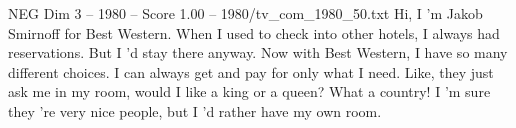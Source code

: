 \begin{textsample}{NEG Dim 3 – 1980 – Score 1.00 – 1980/tv\_com\_1980\_50.txt}  \label{ex:f3_neg_047}
Hi, I 'm Jakob Smirnoff for Best Western.
When I used to check into other hotels, I always had reservations.
But I 'd stay there anyway.
Now with Best Western, I have so many different choices.
I can always get and pay for only what I need.
Like, they just ask me in my room, would I like a king or a queen?
What a country!
I 'm sure they 're very nice people, but I 'd rather have my own room.

\end{textsample}
